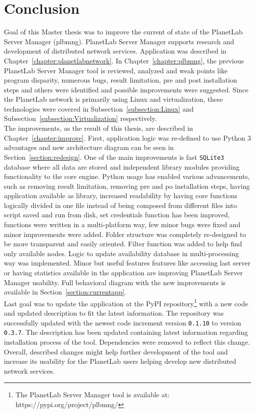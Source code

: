 \chapter{Conclusion}
Goal of this Master thesis was to improve the current of state of the PlanetLab Server Manager (plbmng). PlanetLab Server Manager supports research and development of distributed network services. Application was described in Chapter~\ref{chapter:planetlabnetwork}. In Chapter~\ref{chapter:plbmng}, the previous PlanetLab Server Manager tool is reviewed, analyzed and weak points like program disparity, numerous bugs, result limitation, pre and post installation steps and others were identified and possible improvements were suggested. Since the PlanetLab network is primarily using Linux and virtualization, these technologies were covered in Subsection~\ref{subsection:Linux} and Subsection~\ref{subsection:Virtualization} respectively.\\
The improvements, as the result of this thesis, are described in Chapter~\ref{chapter:improve}. First, application logic was re-defined to use Python 3 advantages and new architecture diagram can be seen in Section~\ref{section:redesign}. One of the main improvements is fast \texttt{SQLite3} database where all data are stored and independent library modules providing functionality to the core engine. Python usage has enabled various advancements, such as removing result limitation, removing pre and po installation steps, having application available as library, increased readability by having core functions logically divided in one file instead of being composed from different files into script saved and run from disk, set credentials function has been improved, functions were written in a multi-platform way, few minor bugs were fixed and minor improvements were added. Folder structure was completely re-designed to be more transparent and easily oriented. Filter function was added to help find only available nodes. Logic to update availability database in multi-processing way was implemented. Minor but useful features features like accessing last server or having statistics available in the application are improving PlanetLab Server Manager usability. Full behavioral diagram with the new improvements is available in Section~\ref{section:currentapp}.\\
Last goal was to update the application at the PyPI repository\footnote{The PlanetLab Server Manager tool is available at: https://pypi.org/project/plbmng/} with a new code and updated description to fit the latest information. The repository was successfully updated with the newest code increment version \texttt{0.1.10} to version \texttt{0.3.7}. The description has been updated containing latest information regarding installation process of the tool. Dependencies were removed to reflect this change. Overall, described changes might help further development of the tool and increase its usability for the PlanetLab users helping develop new distributed network services.